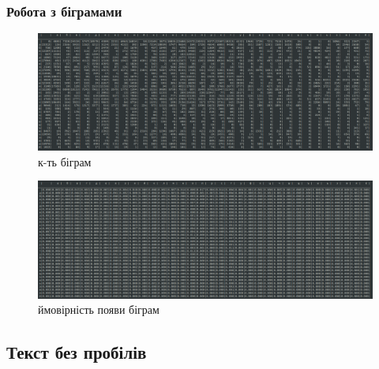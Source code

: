 \documentclass[12pt]{article}
\begin{document}
\newpage
\subsubsection{Робота з біграмами}
\begin{figure}[htbp]
    \centering
    \includegraphics[width=1.0\textwidth]{screenshots/bigram_freq_with_space.png}
    \caption{к-ть біграм}
    \label{fig:screenshot}
\end{figure}
\begin{figure}[htbp]
    \centering
    \includegraphics[width=1.0\textwidth]{screenshots/bigram_prob_with_space.png}
    \caption{ймовірність появи біграм}
    \label{fig:screenshot}
\end{figure}

\newpage
\subsection{Текст без пробілів}
\end{document}
